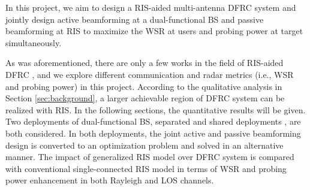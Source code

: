 In this project, we aim to design a RIS-aided multi-antenna DFRC system and
jointly design active beamforming at a dual-functional BS and passive beamforming at RIS 
to maximize the WSR at users and probing power at target simultaneously.

As was aforementioned, there are only a few works in the field of RIS-aided DFRC \cite{wang2020ris,jiang2021dfrc,wang2021joint}, and we explore
different communication and radar metrics (i.e., WSR and probing power) in this project. According to the qualitative analysis in
Section \ref{sec:background}, a larger achievable region of DFRC system can be realized with RIS. In the following sections, the quantitative
results will be given. Two deployments of dual-functional BS, separated and shared deployments \cite{liu2018beamforming, xu2020tradeoff}, are both considered.
In both deployments, the joint active and passive beamforming design is converted to an optimization problem and solved in an 
alternative manner. The impact of generalized RIS model \cite{shen2020modeling} over DFRC system is compared with conventional 
single-connected RIS model in terms of WSR and probing power enhancement in both Rayleigh and LOS channels.

